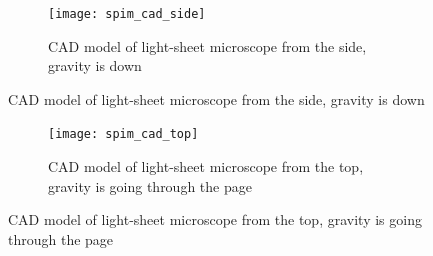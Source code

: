 %
\clearpage
\begin{figure}
    \centering
    \begin{subfigure}[b]{\textwidth}
        \centering
        \texttt{[image: spim\_cad\_side]}
        \caption{\gls{CAD} model of \gls{light-sheet} microscope from the side, gravity is down}
        \label{fig:solidworks_design_front}
    \end{subfigure}
\end{figure}
\clearpage
\begin{figure}
    \ContinuedFloat
    \begin{subfigure}[b]{\textwidth}
        \centering
        \texttt{[image: spim\_cad\_top]}
        \caption{\gls{CAD} model of \gls{light-sheet} microscope from the top, gravity is going through the page}
        \label{fig:soldiworks_top}
    \end{subfigure}   %
\end{figure}
